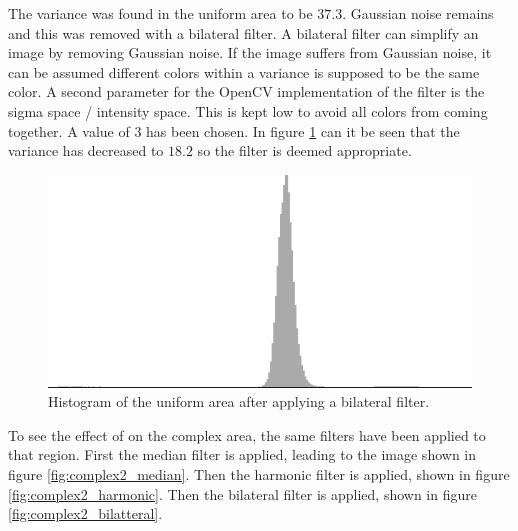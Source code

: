 The variance was found in the uniform area to be $37.3$.
Gaussian noise remains and this was removed with a bilateral filter.
A bilateral filter can simplify an image by removing Gaussian noise.
If the image suffers from Gaussian noise, it can be assumed different colors within a variance is supposed to be the same color.
A second parameter for the OpenCV implementation of the filter is the sigma space / intensity space. 
This is kept low to avoid all colors from coming together. 
A value of 3 has been chosen.
In figure \ref{fig:hist2_bilateral} can it be seen that the variance has decreased to $18.2$ so the filter is deemed appropriate.

\begin{figure}[H]
\centering
\includegraphics[width = \histogramWidth]{graphics/hist2_after_bilatteral.png}
\caption{Histogram of the uniform area after applying a bilateral filter.}
\label{fig:hist2_bilateral}
\end{figure}

To see the effect of on the complex area, the same filters have been applied to that region.
First the median filter is applied, leading to the image shown in figure \ref{fig:complex2_median}.
Then the harmonic filter is applied, shown in figure \ref{fig:complex2_harmonic}.
Then the bilateral filter is applied, shown in figure \ref{fig:complex2_bilatteral}.

